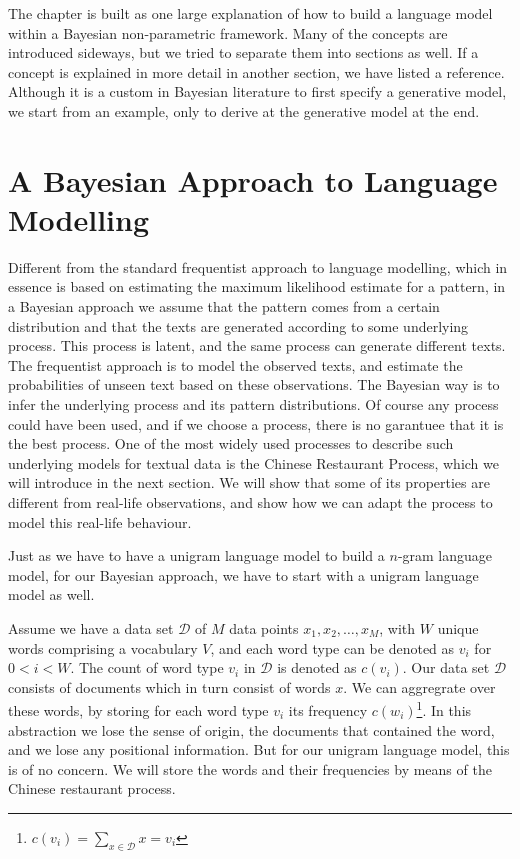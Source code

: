 The chapter is built as one large explanation of how to build a language model within a Bayesian non-parametric framework. Many of the concepts are introduced sideways, but we tried to separate them into sections as well. If a concept is explained in more detail in another section, we have listed a reference. Although it is a custom in Bayesian literature to first specify a generative model, we start from an example, only to derive at the generative model at the end.

\section{A Bayesian Approach to Language Modelling}

Different from the standard frequentist approach to language modelling, which in essence is based on estimating the maximum likelihood estimate for a pattern, in a Bayesian approach we assume that the pattern comes from a certain distribution and that the texts are generated according to some underlying process. This process is latent, and the same process can generate different texts. The frequentist approach is to model the observed texts, and estimate the probabilities of unseen text based on these observations. The Bayesian way is to infer the underlying process and its pattern distributions. Of course any process could have been used, and if we choose a process, there is no garantuee that it is the best process. One of the most widely used processes to describe such underlying models for textual data is the Chinese Restaurant Process, which we will introduce in the next section. We will show that some of its properties are different from real-life observations, and show how we can adapt the process to model this real-life behaviour.

Just as we have to have a unigram language model to build a $n$-gram language model, for our Bayesian approach, we have to start with a unigram language model as well.

Assume we have a data set $\mathcal{D}$ of $M$ data points $x_1, x_2, \ldots, x_M$, with $W$ unique words comprising a vocabulary $V$, and each word type can be denoted as $v_i$ for $0 < i < W$. The count of word type $v_i$ in $\mathcal{D}$ is denoted as $c(v_i)$. Our data set $\mathcal{D}$ consists of documents which in turn consist of words $x$. We can aggregrate over these words, by storing for each word type $
v_i$ its frequency $c(w_i)$\footnote{$c(v_i) = \sum_{x\in\mathcal{D}} x = v_i$}. In this abstraction we lose the sense of origin, the documents that contained the word, and we lose any positional information. But for our unigram language model, this is of no concern. We will store the words and their frequencies by means of the Chinese restaurant process.

